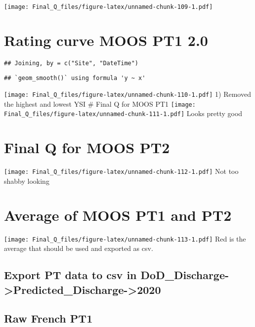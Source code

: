 \documentclass[
]{article}
\begin{document}
\texttt{[image: Final\_Q\_files/figure-latex/unnamed-chunk-109-1.pdf]}

\hypertarget{rating-curve-moos-pt1-2.0}{%
\section{Rating curve MOOS PT1 2.0}\label{rating-curve-moos-pt1-2.0}}

\begin{verbatim}
## Joining, by = c("Site", "DateTime")
\end{verbatim}

\begin{verbatim}
## `geom_smooth()` using formula 'y ~ x'
\end{verbatim}

\texttt{[image: Final\_Q\_files/figure-latex/unnamed-chunk-110-1.pdf]} 1)
Removed the highest and lowest YSI \# Final Q for MOOS PT1
\texttt{[image: Final\_Q\_files/figure-latex/unnamed-chunk-111-1.pdf]}
Looks pretty good

\hypertarget{final-q-for-moos-pt2}{%
\section{Final Q for MOOS PT2}\label{final-q-for-moos-pt2}}

\texttt{[image: Final\_Q\_files/figure-latex/unnamed-chunk-112-1.pdf]} Not
too shabby looking

\hypertarget{average-of-moos-pt1-and-pt2}{%
\section{Average of MOOS PT1 and
PT2}\label{average-of-moos-pt1-and-pt2}}

\texttt{[image: Final\_Q\_files/figure-latex/unnamed-chunk-113-1.pdf]} Red
is the average that should be used and exported as csv.

\hypertarget{export-pt-data-to-csv-in-dod_discharge-predicted_discharge-2020}{%
\subsection{Export PT data to csv in
DoD\_Discharge-\textgreater Predicted\_Discharge-\textgreater2020}\label{export-pt-data-to-csv-in-dod_discharge-predicted_discharge-2020}}

\hypertarget{raw-french-pt1-1}{%
\subsection{Raw French PT1}\label{raw-french-pt1-1}}
\end{document}
